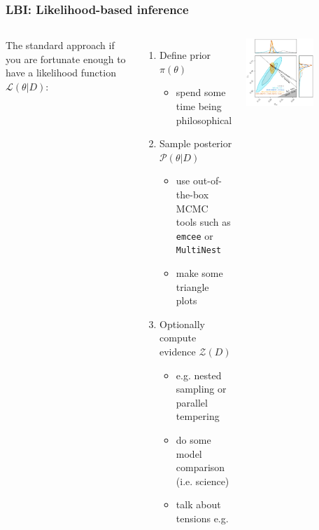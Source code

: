 \documentclass[aspectratio=169,handout]{beamer}
\begin{document}
\begin{frame}
    \frametitle{LBI: Likelihood-based inference}
    \begin{columns}
The standard approach if you are fortunate enough to have a likelihood function $\mathcal{L}(\theta|D)$: 
        \begin{enumerate}
            \item Define prior $\pi(\theta)$ 
                \begin{itemize}
                    \item spend some time being philosophical
                \end{itemize}
            \item Sample posterior $\mathcal{P}(\theta|D)$ 
                \begin{itemize}
                    \item use out-of-the-box MCMC tools such as\\ \texttt{emcee} or \texttt{MultiNest}
                    \item make some triangle plots
                \end{itemize}
            \item Optionally compute evidence $\mathcal{Z}(D)$
                \begin{itemize}
                    \item e.g. nested sampling or parallel tempering
                    \item do some model comparison (i.e. science)
                    \item talk about tensions e.g. 
                \end{itemize}
        \end{enumerate}
        \hfill\includegraphics[width=0.6\textwidth]{figures/des_parameters.pdf}

\end{columns}
\end{frame}
\end{document}
